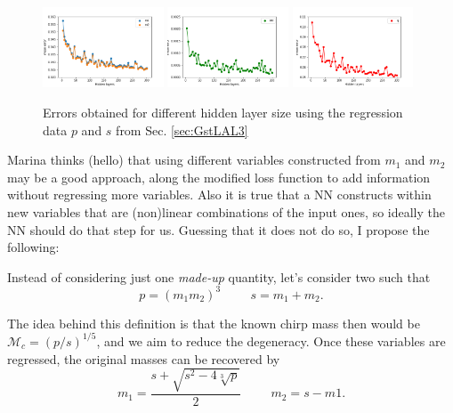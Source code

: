 \documentclass[prd,aps,twocolumn,a4paper,showkeys,nofootinbib]{revtex4-1}
\begin{document}
\begin{figure}[]
  \center
  \includegraphics[width=0.32\textwidth]{./Figs/merrorwlayers}
  \includegraphics[width=0.32\textwidth]{./Figs/mcerrorwlayers}
  \includegraphics[width=0.32\textwidth]{./Figs/qerrorwlayers}
  \caption{\label{fig:error_with_layers} Errors obtained for different hidden layer size using the regression data $p$ and $s$ from Sec. \ref{sec:GstLAL3}}
\end{figure}
%
Marina thinks (hello) that using different variables constructed from $m_1$ and $m_2$ may be a good approach, along the modified loss function to add information without regressing more variables. Also it is true that a NN constructs within new variables that are (non)linear combinations of the input ones, so ideally the NN should do that step for us. Guessing that it does not do so, I propose the following:

Instead of considering just one \textit{made-up} quantity, let's consider two such that
\begin{equation}
p=(m_1m_2)^3 \hspace{1cm} s=m_1+m_2.
\end{equation} 

The idea behind this definition is that the known chirp mass then would be $\mathcal{M}_c=(p/s)^{1/5}$, and we aim to reduce the degeneracy. Once these variables are regressed, the original masses can be recovered by
\begin{equation}
m_1=\frac{s+\sqrt{s^2-4\sqrt[3]{p}}}{2} \hspace{1cm} m_2=s-m1.
\end{equation}
\end{document}
